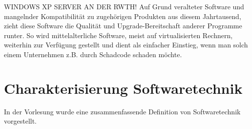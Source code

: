 \documentclass{article}
\begin{document}
\begin{enumerate}[label=\alph*.]
            WINDOWS XP SERVER AN DER RWTH!
            Auf Grund veralteter Software und mangelnder Kompatibilität zu zugehörigen Produkten aus diesem Jahrtausend, zieht diese Software die Qualität und Upgrade-Bereitschaft anderer Programme runter.
            So wird mittelalterliche Software, meist auf virtualisierten Rechnern, weiterhin zur Verfügung gestellt und dient als einfacher Einstieg, wenn man solch einem Unternehmen z.B. durch Schadcode schaden möchte.
    \end{enumerate}

    \newpage
    \section{Charakterisierung Softwaretechnik}
    In der Vorlesung wurde eine zusammenfassende Definition von Softwaretechnik vorgestellt.
\end{document}
